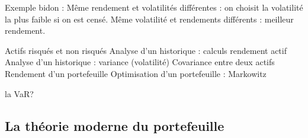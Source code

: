 Exemple bidon :
Même rendement et volatilités différentes : on choisit la volatilité la plus faible si on est censé.
Même volatilité et rendements différents : meilleur rendement.


	  
	  
	  Actifs risqués et non risqués
Analyse d'un historique : calculs rendement actif
Analyse d'un historique : variance (volatilité)
Covariance entre deux actifs
Rendement d'un portefeuille
Optimisation d'un portefeuille : Markowitz


la VaR?

\subsection{La théorie moderne du portefeuille}
